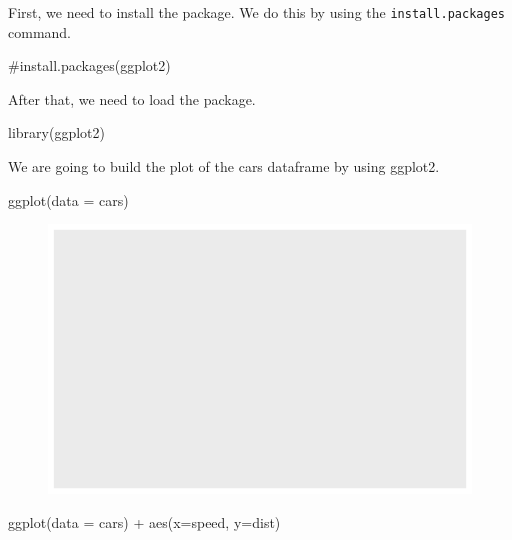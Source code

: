 \documentclass[
  letterpaper,
  DIV=11,
  numbers=noendperiod]{scrartcl}
\newenvironment{Shaded}{\begin{snugshade}}{\end{snugshade}}
\newcommand{\AttributeTok}[1]{\textcolor[rgb]{0.40,0.45,0.13}{#1}}
\newcommand{\CommentTok}[1]{\textcolor[rgb]{0.37,0.37,0.37}{#1}}
\newcommand{\FunctionTok}[1]{\textcolor[rgb]{0.28,0.35,0.67}{#1}}
\newcommand{\NormalTok}[1]{\textcolor[rgb]{0.00,0.23,0.31}{#1}}
\newcommand{\SpecialCharTok}[1]{\textcolor[rgb]{0.37,0.37,0.37}{#1}}
\begin{document}
First, we need to install the package. We do this by using the
\texttt{install.packages} command.

\begin{Shaded}
\begin{Highlighting}[]
\CommentTok{\#install.packages(\textquotesingle{}ggplot2\textquotesingle{})}
\end{Highlighting}
\end{Shaded}

After that, we need to load the package.

\begin{Shaded}
\begin{Highlighting}[]
\FunctionTok{library}\NormalTok{(ggplot2)}
\end{Highlighting}
\end{Shaded}

We are going to build the plot of the cars dataframe by using ggplot2.

\begin{Shaded}
\begin{Highlighting}[]
 \FunctionTok{ggplot}\NormalTok{(}\AttributeTok{data =}\NormalTok{ cars)}
\end{Highlighting}
\end{Shaded}

\begin{figure}[H]

{\centering \includegraphics{class05_files/figure-pdf/unnamed-chunk-4-1.pdf}

}

\end{figure}

\begin{Shaded}
\begin{Highlighting}[]
 \FunctionTok{ggplot}\NormalTok{(}\AttributeTok{data =}\NormalTok{ cars) }\SpecialCharTok{+} \FunctionTok{aes}\NormalTok{(}\AttributeTok{x=}\NormalTok{speed, }\AttributeTok{y=}\NormalTok{dist)}
\end{Highlighting}
\end{Shaded}
\end{document}
